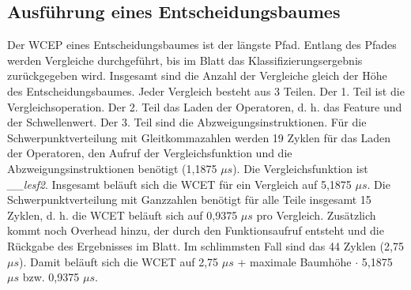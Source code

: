 \subsection{Ausführung eines Entscheidungsbaumes}
Der WCEP eines Entscheidungsbaumes ist der längste Pfad. Entlang des Pfades werden Vergleiche durchgeführt, bis im Blatt das Klassifizierungsergebnis zurückgegeben wird. Insgesamt sind die Anzahl der Vergleiche gleich
der Höhe des Entscheidungsbaumes.
\newline
\newline
Jeder Vergleich besteht aus 3 Teilen. Der 1. Teil ist die Vergleichsoperation. Der 2. Teil das Laden der Operatoren, d. h. das Feature und der Schwellenwert. Der 3. Teil sind die Abzweigungsinstruktionen. Für
die Schwerpunktverteilung mit Gleitkommazahlen werden 19 Zyklen für das Laden der Operatoren, den Aufruf der Vergleichsfunktion und die Abzweigungsinstruktionen benötigt (1,1875 $\mu s$). Die Vergleichsfunktion ist
\textit{\_\_lesf2}. Insgesamt beläuft sich die WCET für ein Vergleich auf 5,1875 $\mu s$. Die Schwerpunktverteilung mit Ganzzahlen benötigt für alle Teile insgesamt 15 Zyklen, d. h. die WCET beläuft sich
auf 0,9375 $\mu s$ pro Vergleich.
\newline
\newline
Zusätzlich kommt noch Overhead hinzu, der durch den Funktionsaufruf entsteht und die Rückgabe des Ergebnisses im Blatt. Im schlimmsten Fall sind das 44 Zyklen (2,75 $\mu s$). Damit beläuft sich die WCET auf
2,75 $\mu s$ + maximale Baumhöhe $\cdot$ 5,1875 $\mu s$ bzw. 0,9375 $\mu s$.